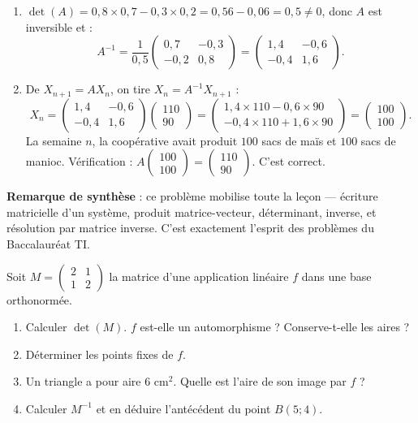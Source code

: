 \documentclass[11pt]{article}
\begin{document}
\begin{exoresolu}
\begin{enumerate}
La semaine $1$ : $95$ sacs de maïs et $55$ sacs de manioc.
\item $\det(A) = {0,8} \times {0,7} - {0,3} \times {0,2} = 0,56 - 0,06 = 0,5 \neq 0$, donc $A$ est inversible et :
\[ A^{-1} = \frac{1}{0,5}\begin{pmatrix} {0,7} & -{0,3} \\ -{0,2} & {0,8} \end{pmatrix} = \begin{pmatrix} 1,4 & -0,6 \\ -0,4 & 1,6 \end{pmatrix}. \]
\item De $X_{n+1} = A X_n$, on tire $X_n = A^{-1} X_{n+1}$ :
\[ X_n = \begin{pmatrix} 1,4 & -0,6 \\ -0,4 & 1,6 \end{pmatrix} \begin{pmatrix} 110 \\ 90 \end{pmatrix} = \begin{pmatrix} 1,4 \times 110 - 0,6 \times 90 \\ -0,4 \times 110 + 1,6 \times 90 \end{pmatrix} = \begin{pmatrix} 100 \\ 100 \end{pmatrix}. \]
La semaine $n$, la coopérative avait produit $100$ sacs de maïs et $100$ sacs de manioc. Vérification : $A\begin{pmatrix} 100 \\ 100 \end{pmatrix} = \begin{pmatrix} 110 \\ 90 \end{pmatrix}$. C'est correct.
\end{enumerate}
\textbf{Remarque de synthèse} : ce problème mobilise toute la leçon — écriture matricielle d'un système, produit matrice-vecteur, déterminant, inverse, et résolution par matrice inverse. C'est exactement l'esprit des problèmes du Baccalauréat TI.
\end{exoresolu}

\begin{exercice}
Soit $M = \begin{pmatrix} 2 & 1 \\ 1 & 2 \end{pmatrix}$ la matrice d'une application linéaire $f$ dans une base orthonormée.
\begin{enumerate}
\item Calculer $\det(M)$. $f$ est-elle un automorphisme ? Conserve-t-elle les aires ?
\item Déterminer les points fixes de $f$.
\item Un triangle a pour aire $6$ cm$^2$. Quelle est l'aire de son image par $f$ ?
\item Calculer $M^{-1}$ et en déduire l'antécédent du point $B(5;4)$.
\end{enumerate}
\end{exercice}
\end{document}
